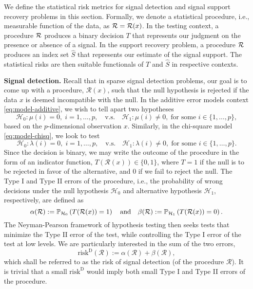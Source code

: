   
We define the statistical risk metrics for signal detection and signal support recovery problems in this section.
Formally, we denote a statistical procedure, i.e., measurable function of the data, as ${\cal R}={\cal R}(x)$.
In the testing context, a procedure ${\cal R}$ produces a binary decision $T$ that represents our judgment on the presence or absence of a signal. 
In the support recovery problem, a procedure ${\cal R}$ produces an index set $\widehat{S}$ that represents our estimate of the signal support.  
The statistical risks are then suitable functionals of ${T}$ and $\widehat{S}$ in respective contexts. 

{\bf Signal detection.} 
Recall that in sparse signal detection problems, our goal is to come up with a procedure, $\mathcal{R}(x)$, such that the null hypothesis is rejected if the data $x$ is deemed incompatible with the null.
In the additive error models context \eqref{eq:model-additive}, we wish to tell apart two hypotheses
\begin{equation} \label{eq:global-test-additive}
    \mathcal{H}_0: \mu(i) = 0, \;i=1,\ldots,p,
    \quad\text{v.s.}\quad 
    \mathcal{H}_1: \mu(i)\neq 0, \; \text{for some }i\in\{1,\ldots,p\},
\end{equation}
based on the $p$-dimensional observation $x$.
Similarly, in the chi-square model \eqref{eq:model-chisq}, we look to test
\begin{equation} \label{eq:global-test-chisq}
    \mathcal{H}_0: \lambda(i) = 0, \;i=1,\ldots,p,
    \quad\text{v.s.}\quad 
    \mathcal{H}_1: \lambda(i)\neq 0, \; \text{for some }i\in\{1,\ldots,p\}.
\end{equation} 
Since the decision is binary, we may write the outcome of the procedure in the form of an indicator function, 
$T(\mathcal{R}(x))\in\{0,1\}$, where $T=1$ if the null is to be rejected in favor of the alternative, and 0 if we fail to reject the null. 
The Type I and Type II errors of the procedure, i.e., the probability of wrong decisions under the null hypothesis $\mathcal{H}_0$ and alternative hypothesis $\mathcal{H}_1$, respectively, are defined as 
\begin{equation} \label{eq:type-II-error}
    \alpha(\mathcal{R}) := \P_{\mathcal{H}_0}\left(T(\mathcal{R}(x))=1\right)
    \quad \text{and} \quad
    \beta(\mathcal{R}) := \P_{\mathcal{H}_1}\left(T(\mathcal{R}(x))=0\right).
\end{equation}
The Neyman-Pearson framework of hypothesis testing then seeks tests that minimize the Type II error of the test, while controlling the Type I error of the test at low levels.
We are particularly interested in the sum of the two errors, 
\begin{equation} \label{eq:risk-detection}
    \mathrm{risk}^{\mathrm{D}}(\mathcal{R}) := \alpha(\mathcal{R}) + \beta(\mathcal{R}),
\end{equation}
which shall be referred to as the risk of signal detection (of the procedure $\mathcal{R}$).
It is trivial that a small $\mathrm{risk}^{\mathrm{D}}$ would imply both small Type I and Type II errors of the procedure.

